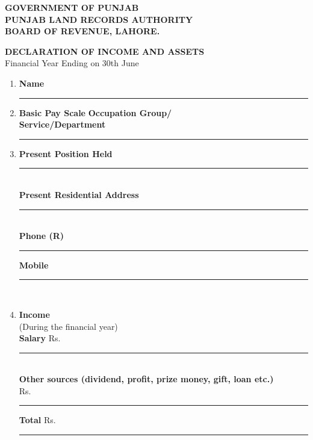 \documentclass{article}
\begin{document}
\begin{center}
\textbf{GOVERNMENT OF PUNJAB} \\
\textbf{PUNJAB LAND RECORDS AUTHORITY} \\
\textbf{BOARD OF REVENUE, LAHORE.}
\end{center}

\begin{center}
\textbf{DECLARATION OF INCOME AND ASSETS} \\
Financial Year Ending on 30th June \underline{\hspace{2cm}}
\end{center}

\begin{enumerate}
    \item \textbf{Name} \hspace{1cm} \rule{10cm}{0.5pt}
    \item \textbf{Basic Pay Scale} \hspace{1cm} \framebox[1cm][c]{} \hspace{1cm} \textbf{Occupation Group/} \\
    \textbf{Service/Department} \hspace{1cm} \rule{10cm}{0.5pt}
    \item \textbf{Present Position Held} \hspace{1cm} \rule{10cm}{0.5pt} \\
    \textbf{Present Residential Address} \hspace{1cm} \rule{10cm}{0.5pt} \\
    \textbf{Phone (R)} \hspace{1cm} \rule{5cm}{0.5pt} \hspace{1cm} \textbf{Mobile} \hspace{1cm} \rule{5cm}{0.5pt} \\
    \item \textbf{Income} \\
    (During the financial year) \\
    \textbf{Salary} \hspace{1cm} Rs. \hspace{1cm} \rule{7cm}{0.5pt} \\
    \textbf{Other sources (dividend, profit, prize money, gift, loan etc.)} \\
    Rs. \hspace{1cm} \rule{7cm}{0.5pt} \hspace{1cm} \textbf{Total} \hspace{1cm} Rs. \hspace{1cm} \rule{7cm}{0.5pt} \\

\end{enumerate}
\end{document}
